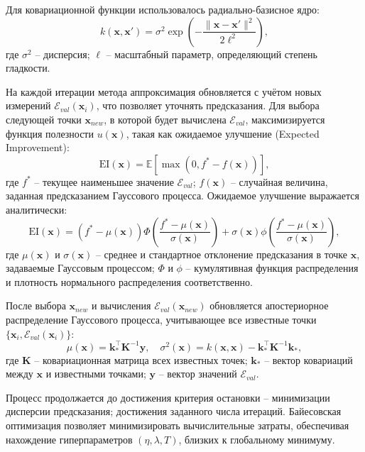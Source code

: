Для ковариационной функции использовалось радиально-базисное ядро:
\begin{equation}
k(\mathbf{x}, \mathbf{x}') = \sigma^2 \exp\left(-\frac{\|\mathbf{x} - \mathbf{x}'\|^2}{2\ell^2}\right),
\end{equation}
где $\sigma^2$ -- дисперсия;
$\ell$ -- масштабный параметр, определяющий степень гладкости.

На каждой итерации метода аппроксимация обновляется с учётом новых
измерений $\mathcal{E}_{val}(\mathbf{x}_i)$, что позволяет уточнять
предсказания. Для выбора следующей точки $\mathbf{x}_{new}$, в которой будет
вычислена $\mathcal{E}_{val}$, максимизируется функция полезности $u(\mathbf{x})$,
такая как ожидаемое улучшение (Expected Improvement):
\begin{equation}
\text{EI}(\mathbf{x}) = \mathbb{E}[\max(0, f^* - f(\mathbf{x}))],
\end{equation}
где $f^*$ -- текущее наименьшее значение $\mathcal{E}_{val}$;
$f(\mathbf{x})$ -- случайная величина, заданная предсказанием
Гауссового процесса. Ожидаемое улучшение выражается аналитически:
\begin{equation}
\text{EI}(\mathbf{x}) = (f^* - \mu(\mathbf{x}))\Phi\left(\frac{f^* - \mu(\mathbf{x})}{\sigma(\mathbf{x})}\right) + \sigma(\mathbf{x})\phi\left(\frac{f^* - \mu(\mathbf{x})}{\sigma(\mathbf{x})}\right),
\end{equation}
где $\mu(\mathbf{x})$ и $\sigma(\mathbf{x})$ -- среднее и стандартное отклонение предсказания в
точке $\mathbf{x}$, задаваемые Гауссовым процессом;
$\Phi$ и $\phi$ -- кумулятивная функция распределения и плотность нормального распределения соответственно.

После выбора $\mathbf{x}_{new}$ и вычисления $\mathcal{E}_{val}(\mathbf{x}_{new})$ обновляется
апостериорное распределение Гауссового процесса, учитывающее все известные
точки $\{\mathbf{x}_i, \mathcal{E}_{val}(\mathbf{x}_i)\}$:
\begin{equation}
\mu(\mathbf{x}) = \mathbf{k}_*^\top \mathbf{K}^{-1} \mathbf{y}, \quad \sigma^2(\mathbf{x}) = k(\mathbf{x}, \mathbf{x}) - \mathbf{k}_*^\top \mathbf{K}^{-1} \mathbf{k}_*,
\end{equation}
где $\mathbf{K}$ -- ковариационная матрица всех известных точек;
$\mathbf{k}_*$ -- вектор ковариаций между $\mathbf{x}$ и известными точками;
$\mathbf{y}$ -- вектор значений $\mathcal{E}_{val}$.

Процесс продолжается до достижения критерия остановки -- минимизации дисперсии предсказания;
достижения заданного числа итераций. Байесовская оптимизация позволяет
минимизировать вычислительные затраты, обеспечивая нахождение
гиперпараметров $(\eta, \lambda, T)$, близких к глобальному минимуму.
